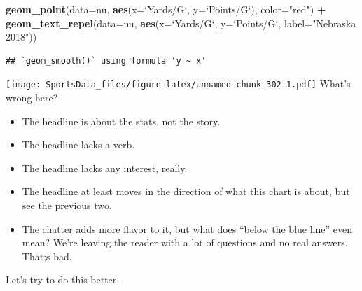\documentclass[
]{book}
\newenvironment{Shaded}{\begin{snugshade}}{\end{snugshade}}
\newcommand{\DataTypeTok}[1]{\textcolor[rgb]{0.13,0.29,0.53}{#1}}
\newcommand{\KeywordTok}[1]{\textcolor[rgb]{0.13,0.29,0.53}{\textbf{#1}}}
\newcommand{\NormalTok}[1]{#1}
\newcommand{\OperatorTok}[1]{\textcolor[rgb]{0.81,0.36,0.00}{\textbf{#1}}}
\newcommand{\StringTok}[1]{\textcolor[rgb]{0.31,0.60,0.02}{#1}}
\providecommand{\tightlist}{%
  \setlength{\itemsep}{0pt}\setlength{\parskip}{0pt}}
\begin{document}
\begin{Shaded}
\begin{Highlighting}[]
\StringTok{  }\KeywordTok{geom_point}\NormalTok{(}\DataTypeTok{data=}\NormalTok{nu, }\KeywordTok{aes}\NormalTok{(}\DataTypeTok{x=}\StringTok{`}\DataTypeTok{Yards/G}\StringTok{`}\NormalTok{, }\DataTypeTok{y=}\StringTok{`}\DataTypeTok{Points/G}\StringTok{`}\NormalTok{), }\DataTypeTok{color=}\StringTok{"red"}\NormalTok{) }\OperatorTok{+}\StringTok{ }
\StringTok{  }\KeywordTok{geom_text_repel}\NormalTok{(}\DataTypeTok{data=}\NormalTok{nu, }\KeywordTok{aes}\NormalTok{(}\DataTypeTok{x=}\StringTok{`}\DataTypeTok{Yards/G}\StringTok{`}\NormalTok{, }\DataTypeTok{y=}\StringTok{`}\DataTypeTok{Points/G}\StringTok{`}\NormalTok{, }\DataTypeTok{label=}\StringTok{"Nebraska 2018"}\NormalTok{))}
\end{Highlighting}
\end{Shaded}

\begin{verbatim}
## `geom_smooth()` using formula 'y ~ x'
\end{verbatim}

\texttt{[image: SportsData\_files/figure-latex/unnamed-chunk-302-1.pdf]}
What's wrong here?

\begin{itemize}
\tightlist
\item
  The headline is about the stats, not the story.
\item
  The headline lacks a verb.
\item
  The headline lacks any interest, really.
\item
  The headline at least moves in the direction of what this chart is about, but see the previous two.
\item
  The chatter adds more flavor to it, but what does ``below the blue line'' even mean? We're leaving the reader with a lot of questions and no real answers. That;s bad.
\end{itemize}

Let's try to do this better.
\end{document}
